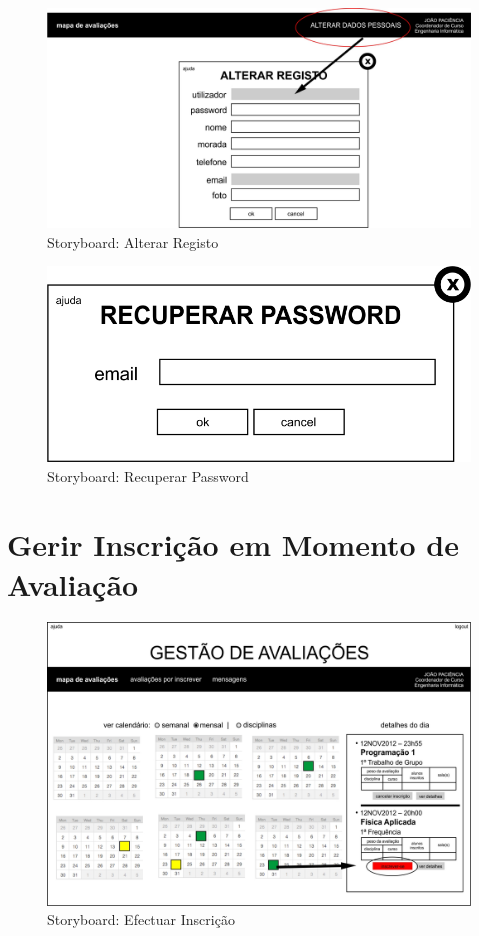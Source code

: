 \begin{figure}[!htbp]
\centering
\includegraphics{imagens/alterar_registo_i.jpg}
\caption{Storyboard: Alterar Registo}
\label{fig:alterar_registo_i}
\end{figure}

\begin{figure}[!htbp]
\centering
\includegraphics{imagens/recuperar_password_i.jpg}
\caption{Storyboard: Recuperar Password}
\label{fig:recuperar_password_i}
\end{figure}

\clearpage
\section{Gerir Inscrição em Momento de Avaliação}

\begin{figure}[!htbp]
\centering
\includegraphics{imagens/efectuar_inscricao_i.jpg}
\caption{Storyboard: Efectuar Inscrição}
\label{fig:efectuar_inscricao_i}
\end{figure}

